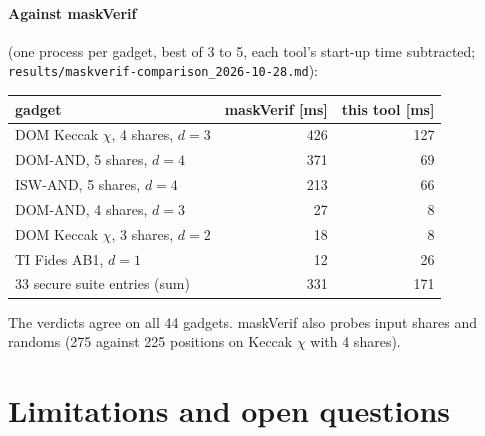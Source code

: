 \documentclass[11pt,a4paper]{article}
\theoremstyle{definition}
\theoremstyle{remark}
\newcommand{\code}[1]{\texttt{\small #1}}
\begin{document}
\paragraph{Against maskVerif} (one process per gadget, best of 3 to 5, each tool's start-up time
subtracted; \code{results/maskverif-comparison\_2026-10-28.md}):
\begin{center}\small
\begin{tabular}{@{}lrr@{}}
\toprule
gadget & maskVerif [ms] & this tool [ms]\\
\midrule
DOM Keccak $\chi$, 4 shares, $d=3$ & 426 & 127\\
DOM-AND, 5 shares, $d=4$ & 371 & 69\\
ISW-AND, 5 shares, $d=4$ & 213 & 66\\
DOM-AND, 4 shares, $d=3$ & 27 & 8\\
DOM Keccak $\chi$, 3 shares, $d=2$ & 18 & 8\\
TI Fides AB1, $d=1$ & 12 & 26\\
33 secure suite entries (sum) & 331 & 171\\
\bottomrule
\end{tabular}
\end{center}
The verdicts agree on all 44 gadgets.  maskVerif \cite{maskVerif} also probes input shares
and randoms (275 against 225 positions on Keccak $\chi$ with 4 shares).

\section{Limitations and open questions}\label{sec:limits}
\end{document}
